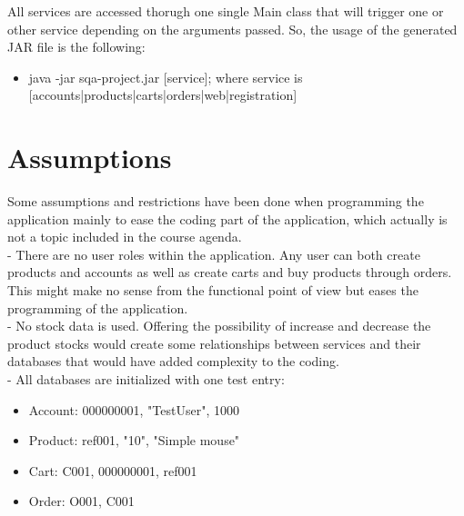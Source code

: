All services are accessed thorugh one single Main class that will trigger one or other service depending on the arguments passed. So, the usage of the generated JAR file is the following:

\begin{itemize}
	\item java -jar sqa-project.jar [service]; where service is [accounts|products|carts|orders|web|registration]
\end{itemize}


\section{Assumptions}
Some assumptions and restrictions have been done when programming the application mainly to ease the coding part of the application, which actually is not a topic included in the course agenda.\\
 
- There are no user roles within the application. Any user can both create products and accounts as well as create carts and buy products through orders. This might make no sense from the functional point of view but eases the programming of the application.\\

- No stock data is used. Offering the possibility of increase and decrease the product stocks would create some relationships between services and their databases that would have added complexity to the coding.\\

- All databases are initialized with one test entry:

\begin{itemize}
\item Account: 000000001, "TestUser", 1000
\item Product: ref001, "10", "Simple mouse"
\item Cart: C001, 000000001, ref001
\item Order: O001, C001
\end{itemize}
